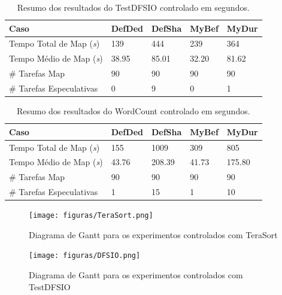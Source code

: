 \begin{table}[h!]
	\caption{Resumo dos resultados do TestDFSIO controlado em segundos.} \label{tab:exp1IO}
	\begin{tabular*}{\hsize}{lllll} %
		\textbf{Caso} & \textbf{DefDed} & \textbf{DefSha} & \textbf{MyBef} & \textbf{MyDur}\\
		\hline
		Tempo Total de Map ({\it{s}}) & 139 & 444 & 239 & 364 \\
		Tempo Médio de Map ({\it{s}}) & 38.95 & 85.01 & 32.20 & 81.62 \\
		\# Tarefas Map & 90 & 90 & 90 & 90 \\
		\# Tarefas Especulativas & 0 & 9 & 0 & 1 \\
	\end{tabular*}
\end{table}


\begin{table}[h!]
	\caption{Resumo dos resultados do WordCount controlado em segundos.} \label{tab:exp1WC}
	\begin{tabular*}{\hsize}{lllll} %
		\textbf{Caso} & \textbf{DefDed} & \textbf{DefSha} & \textbf{MyBef} & \textbf{MyDur}\\
		\hline
		Tempo Total de Map ({\it{s}}) & 155 & 1009 & 309 & 805 \\
		Tempo Médio de Map ({\it{s}}) & 43.76 & 208.39 & 41.73 & 175.80 \\
		\# Tarefas Map & 90 & 90 & 90 & 90 \\
		\# Tarefas Especulativas & 1 & 15 & 1 & 10 \\
	\end{tabular*}
\end{table}

\begin{figure}[!ht]
	\centering
	\texttt{[image: figuras/TeraSort.png]}
	\caption{Diagrama de Gantt para os experimentos controlados com TeraSort}
	\label{fig:exp1TS}
\end{figure}

\begin{figure}[!ht]
	\centering
	\texttt{[image: figuras/DFSIO.png]}%
	\caption{Diagrama de Gantt para os experimentos controlados com TestDFSIO}
	\label{fig:exp1IO}
\end{figure}

